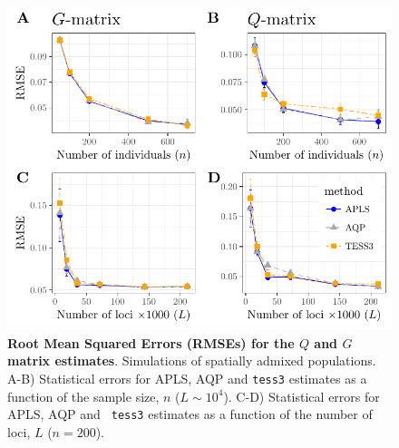 \clearpage 
\newpage


\begin{figure}
  \centering
  \includegraphics{./Figures/figure1.pdf}
  \caption{{\bf Root Mean Squared Errors (RMSEs) for the $Q$ and $G$ matrix
      estimates}. Simulations of spatially admixed populations. A-B) Statistical
    errors for APLS, AQP and {\tt tess3} estimates as a function of the sample
    size, $n$ ($L \sim 10^4$). C-D) Statistical errors for APLS, AQP and {\tt
      tess3} estimates as a function of the number of loci, $L$ ($n = 200$).}
  \label{fig:fig1}
\end{figure}  

\clearpage 
\newpage

